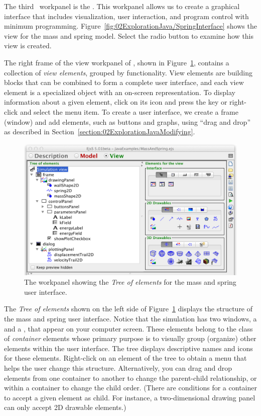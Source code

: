 The third \Ejs\ workpanel is the .  This workpanel allows us to create a graphical interface that includes
visualization, user interaction, and program control with minimum programming.
Figure~\ref{fig:02ExplorationJava/SpringInterface} shows the view for the mass and spring model. Select the  radio
button to examine how this view is created.

The right frame of the view workpanel of \ejs, shown in Figure~\ref{fig:02ExplorationJava/View}, contains a collection of
\emph{view elements}, grouped by functionality. View elements are building blocks that can be
combined to form a complete user interface, and each view element is a specialized object with an on-screen
representation. To display information about a given element, click on its icon and press the  key or right-click and select the  menu item. To create a user interface, we create a frame (window) and add elements, such as buttons and graphs, using ``drag and drop'' as described in Section~\ref{section:02ExplorationJavaModifying}.

\begin{figure}[htb]
    \centering
  \includegraphics[scale=\scale]{02ExplorationJava/images/View.png}
    \caption{The  workpanel showing the \emph{Tree of elements} for the mass and spring user interface.}
    \label{fig:02ExplorationJava/View}
\end{figure}

The \emph{Tree of elements} shown on the left side of Figure~\ref{fig:02ExplorationJava/View} displays the structure of the
mass and spring user interface. Notice that the simulation has two windows, a  and a , that appear on your computer screen.
These elements belong to the class of \emph{container} elements whose primary
purpose is to visually group (organize) other elements within the user interface.
The tree displays descriptive names and icons for these elements.   Right-click on an element of the tree to
obtain a menu that helps the user change this structure. Alternatively, you can drag and drop elements from one container to another to change the parent-child relationship, or within a container to change the child order. (There are conditions for a container to accept a given element as child. For instance, a two-dimensional drawing panel can only accept 2D drawable elements.)

